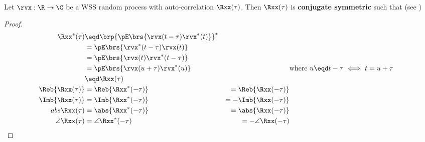 \begin{theorem}
Let $\rvx:\R\to\C$ be a WSS random process with
auto-correlation $\Rxx(\tau)$.
Then $\Rxx(\tau)$ is \textbf{conjugate symmetric} such that
(see )
\end{theorem}
\begin{proof}
\begin{align*}
  \Rxx^\ast(\tau)
    &\eqd \brp{ \pE\brs{\rvx(t-\tau)\rvx^\ast(t)}}^\ast
  \\&=           \pE\brs{\rvx^\ast(t-\tau)\rvx(t)}
  \\&=           \pE\brs{\rvx(t)\rvx^\ast(t-\tau)}
  \\&=           \pE\brs{\rvx(u+\tau)\rvx^\ast(u)}
    &&\text{where $u\eqd t-\tau$ $\iff$ $t=u+\tau$}
  \\&\eqd         \Rxx(\tau)
  \\
  \Reb{\Rxx(\tau)}
    &= \Reb{\Rxx^\ast(-\tau)}
    &= \Reb{\Rxx(-\tau)}
  \\
  \Imb{\Rxx(\tau)}
    &= \Imb{\Rxx^\ast(-\tau)}
    &= -\Imb{\Rxx(-\tau)}
  \\
  abs{\Rxx(\tau)}
    &= \abs{\Rxx^\ast(-\tau)}
    &= \abs{\Rxx(-\tau)}
  \\
  \angle\Rxx(\tau)
    &= \angle\Rxx^\ast(-\tau)
    &= -\angle\Rxx(-\tau)
\end{align*}
\end{proof}

